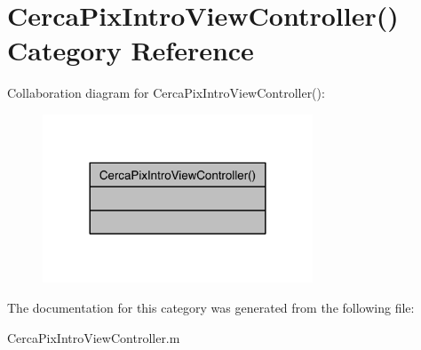 \hypertarget{category_cerca_pix_intro_view_controller_07_08}{\section{Cerca\-Pix\-Intro\-View\-Controller() Category Reference}
\label{category_cerca_pix_intro_view_controller_07_08}
}


Collaboration diagram for Cerca\-Pix\-Intro\-View\-Controller()\-:\nopagebreak
\begin{figure}[H]
\begin{center}
\leavevmode
\includegraphics[width=228pt]{category_cerca_pix_intro_view_controller_07_08__coll__graph}
\end{center}
\end{figure}


The documentation for this category was generated from the following file\-:\begin{DoxyCompactItemize}
\item 
Cerca\-Pix\-Intro\-View\-Controller.\-m\end{DoxyCompactItemize}
